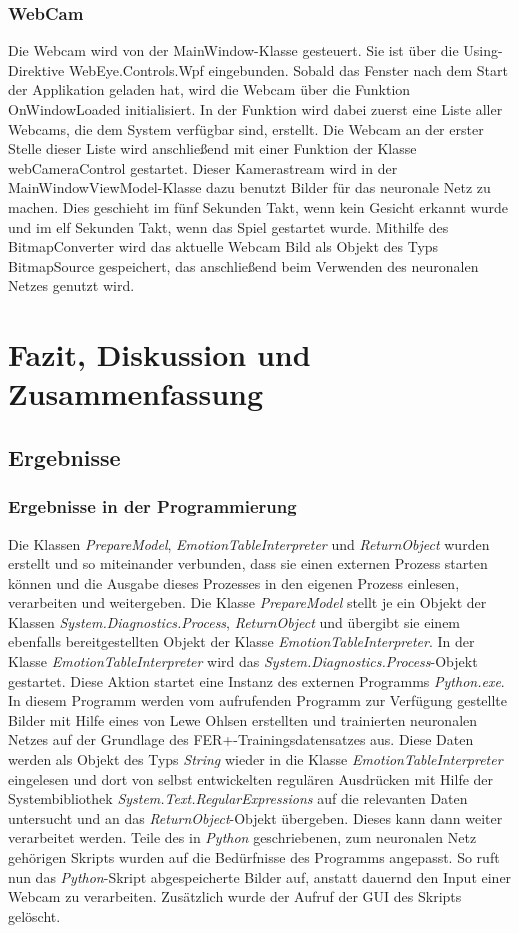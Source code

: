 \documentclass[12pt,a4paper,headinclude,twoside, plainheadsepline, open=right,numbers=noenddot]{scrreprt}
\begin{document}
\subsection{WebCam}
Die Webcam wird von der MainWindow-Klasse gesteuert. Sie ist über die Using-Direktive WebEye.Controls.Wpf eingebunden.   Sobald das Fenster nach dem Start der Applikation geladen hat, wird die Webcam über die Funktion
 OnWindowLoaded initialisiert. In der Funktion wird dabei zuerst eine Liste aller Webcams, die dem System verfügbar sind, erstellt.  Die Webcam an der erster Stelle dieser Liste wird anschließend mit einer Funktion der Klasse webCameraControl gestartet. Dieser Kamerastream wird in der MainWindowViewModel-Klasse dazu benutzt Bilder für das neuronale Netz zu machen. Dies geschieht im fünf Sekunden Takt, wenn kein Gesicht erkannt wurde und im elf Sekunden Takt, wenn das Spiel gestartet wurde. Mithilfe des BitmapConverter wird das aktuelle Webcam Bild 
als Objekt des Typs BitmapSource gespeichert, das anschließend beim Verwenden des neuronalen Netzes genutzt wird.


\chapter{Fazit, Diskussion und Zusammenfassung}
\section{Ergebnisse}
\subsection{Ergebnisse in der Programmierung}
Die Klassen \textit{PrepareModel}, \textit{EmotionTableInterpreter} und \textit{ReturnObject} wurden erstellt und so miteinander verbunden, dass sie einen externen Prozess starten k\"{o}nnen und die Ausgabe dieses Prozesses in den eigenen Prozess einlesen, verarbeiten und weitergeben. Die Klasse \textit{PrepareModel} stellt je ein Objekt der Klassen \textit{System.Diagnostics.Process},  \textit{ReturnObject} und \"{u}bergibt sie einem ebenfalls bereitgestellten Objekt der Klasse  \textit{EmotionTableInterpreter}.
In der Klasse \textit{EmotionTableInterpreter} wird das \textit{System.Diagnostics.Process}-Objekt gestartet. Diese Aktion startet eine Instanz des externen Programms \textit{Python.exe}. In diesem Programm werden vom aufrufenden Programm zur Verf\"{u}gung gestellte Bilder mit Hilfe eines von Lewe Ohlsen \cite{LeweOhlsen} erstellten und trainierten neuronalen Netzes auf der Grundlage des FER+-Trainingsdatensatzes aus. Diese Daten werden als Objekt des Typs \textit{String} wieder in die Klasse \textit{EmotionTableInterpreter} eingelesen und dort von selbst entwickelten regul\"{a}ren Ausdr\"{u}cken mit Hilfe der Systembibliothek \textit{System.Text.RegularExpressions} auf die relevanten Daten untersucht und an das \textit{ReturnObject}-Objekt \"{u}bergeben. Dieses kann dann weiter verarbeitet werden. Teile des in \textit{Python} geschriebenen, zum neuronalen Netz geh\"{o}rigen Skripts wurden auf die Bed\"{u}rfnisse des Programms angepasst. So ruft nun das \textit{Python}-Skript abgespeicherte Bilder auf, anstatt dauernd den Input einer Webcam zu verarbeiten. Zus\"{a}tzlich wurde der Aufruf der GUI des Skripts gel\"{o}scht.
\end{document}
